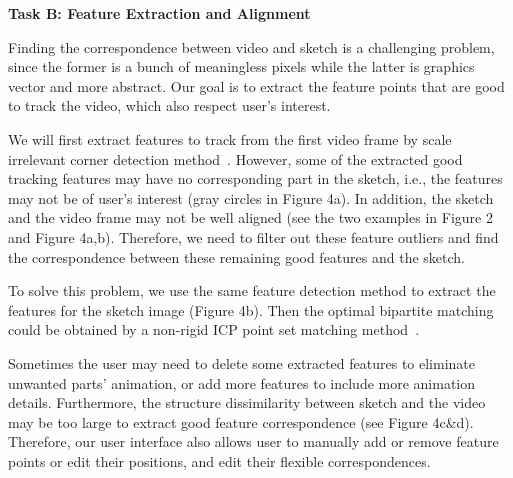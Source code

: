 \textbf{Task B: Feature Extraction and Alignment}

Finding the correspondence between video and sketch is a challenging problem, since the former is a bunch of meaningless pixels while the latter is graphics vector and more abstract. Our goal is to extract the feature points that are good to track the video, which also respect user's interest.

We will first extract features to track from the first video frame by scale irrelevant corner detection method~\cite{grauman:2011}.
However, some of the extracted good tracking features may have no corresponding part in the sketch, i.e., the features may not be of user's interest (gray circles in Figure 4a). In addition, the sketch and the video frame may not be well aligned (see the two examples in Figure 2 and Figure 4a,b).
Therefore, we need to filter out these feature outliers and find the correspondence between these remaining good features and the sketch.

To solve this problem, we use the same feature detection method to extract the features for the sketch image (Figure 4b). Then the optimal bipartite matching could be obtained by a non-rigid ICP point set matching method~\cite{Chui2003114}.


Sometimes the user may need to delete some extracted features to eliminate unwanted parts' animation, or add more features to include more animation details. 
Furthermore,  the structure dissimilarity between sketch and the video may be too large to extract good feature correspondence (see Figure 4c\&d).
Therefore, our user interface also allows user to manually add or remove feature points or edit their positions, and edit their flexible correspondences.




